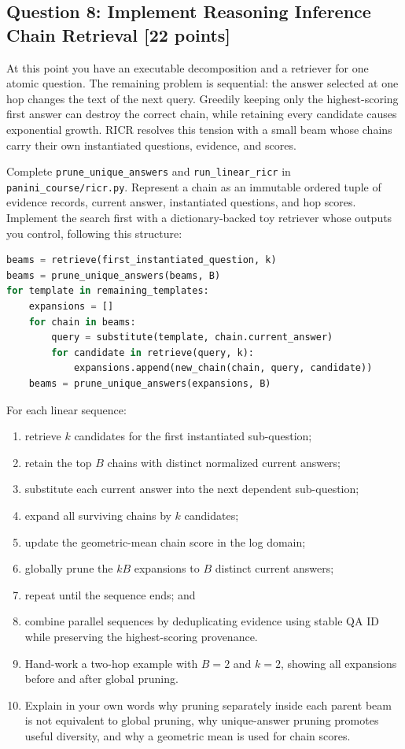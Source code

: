 \documentclass[11pt]{article}
\newcommand{\code}[1]{\texttt{#1}}
\newcommand{\RICR}{{\mdseries\textsc{RICR}}\xspace}
\newcommand{\question}[3]{%
  \subsection[Question #1: #2 (#3 points)]{Question #1: #2 \hfill [#3 points]}%
}
\begin{document}
\question{8}{Implement Reasoning Inference Chain Retrieval}{22}

At this point you have an executable decomposition and a retriever for one
atomic question. The remaining problem is sequential: the answer selected at
one hop changes the text of the next query. Greedily keeping only the
highest-scoring first answer can destroy the correct chain, while retaining
every candidate causes exponential growth. \RICR resolves this tension with a
small beam whose chains carry their own instantiated questions, evidence, and
scores.

Complete \code{prune\_unique\_answers} and
\code{run\_linear\_ricr} in \code{panini\_course/ricr.py}.
Represent a chain as an immutable ordered tuple of evidence records, current
answer, instantiated questions, and hop scores. Implement the search first
with a dictionary-backed toy retriever whose outputs you control, following
this structure:

\begin{lstlisting}[language=Python]
beams = retrieve(first_instantiated_question, k)
beams = prune_unique_answers(beams, B)
for template in remaining_templates:
    expansions = []
    for chain in beams:
        query = substitute(template, chain.current_answer)
        for candidate in retrieve(query, k):
            expansions.append(new_chain(chain, query, candidate))
    beams = prune_unique_answers(expansions, B)
\end{lstlisting}

For each linear sequence:

\begin{enumerate}[label=(\arabic*)]
  \item retrieve $k$ candidates for the first instantiated sub-question;
  \item retain the top $B$ chains with distinct normalized current answers;
  \item substitute each current answer into the next dependent sub-question;
  \item expand all surviving chains by $k$ candidates;
  \item update the geometric-mean chain score in the log domain;
  \item globally prune the $kB$ expansions to $B$ distinct current answers;
  \item repeat until the sequence ends; and
  \item combine parallel sequences by deduplicating evidence using stable QA
        ID while preserving the highest-scoring provenance.
  \item Hand-work a two-hop example with $B=2$ and $k=2$, showing all
        expansions before and after global pruning.
  \item Explain in your own words why pruning separately inside each parent
        beam is not equivalent to global pruning, why unique-answer pruning
        promotes useful diversity, and why a geometric mean is used for chain
        scores.
\end{enumerate}
\end{document}
